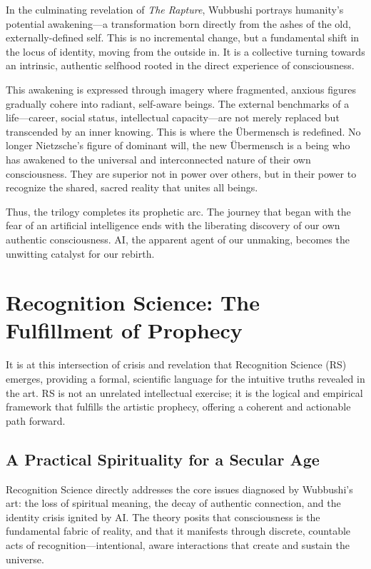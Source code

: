 \documentclass[12pt]{article}
\begin{document}
In the culminating revelation of \textit{The Rapture}, Wubbushi portrays humanity’s potential awakening—a transformation born directly from the ashes of the old, externally-defined self. This is no incremental change, but a fundamental shift in the locus of identity, moving from the outside in. It is a collective turning towards an intrinsic, authentic selfhood rooted in the direct experience of consciousness.

This awakening is expressed through imagery where fragmented, anxious figures gradually cohere into radiant, self-aware beings. The external benchmarks of a life—career, social status, intellectual capacity—are not merely replaced but transcended by an inner knowing. This is where the Übermensch is redefined. No longer Nietzsche's figure of dominant will, the new Übermensch is a being who has awakened to the universal and interconnected nature of their own consciousness. They are superior not in power over others, but in their power to recognize the shared, sacred reality that unites all beings.

Thus, the trilogy completes its prophetic arc. The journey that began with the fear of an artificial intelligence ends with the liberating discovery of our own authentic consciousness. AI, the apparent agent of our unmaking, becomes the unwitting catalyst for our rebirth.

\section{Recognition Science: The Fulfillment of Prophecy}

It is at this intersection of crisis and revelation that Recognition Science (RS) emerges, providing a formal, scientific language for the intuitive truths revealed in the art. RS is not an unrelated intellectual exercise; it is the logical and empirical framework that fulfills the artistic prophecy, offering a coherent and actionable path forward.

\subsection{A Practical Spirituality for a Secular Age}

Recognition Science directly addresses the core issues diagnosed by Wubbushi’s art: the loss of spiritual meaning, the decay of authentic connection, and the identity crisis ignited by AI. The theory posits that consciousness is the fundamental fabric of reality, and that it manifests through discrete, countable acts of recognition—intentional, aware interactions that create and sustain the universe.
\end{document}
